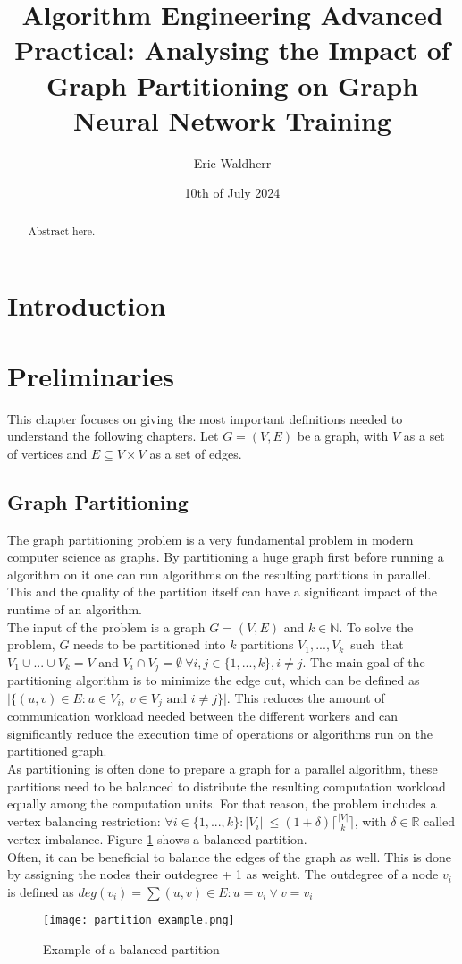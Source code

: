 \documentclass[acmsmall,nonacm,screen,review]{acmart}
\title{Algorithm Engineering Advanced Practical: Analysing the Impact of Graph Partitioning on Graph Neural Network Training}
\author{Eric Waldherr}
\affiliation{%
  \institution{Heidelberg University}
  \streetaddress{Im Neuenheimer Feld 205}
  \city{Heidelberg}
  \state{Baden-Württemberg}
  \country{Germany}
  \postcode{69120}
}
\date{10th of July 2024}
\begin{document}
\begin{abstract}
Abstract here.
\end{abstract}
\maketitle

\section{Introduction}

\section{Preliminaries}
This chapter focuses on giving the most important definitions needed to understand the following chapters. Let $G=(V,E)$ be a graph, with $V$ as a set of vertices and $E \subseteq V \times V$ as a set of edges.
\subsection{Graph Partitioning}
The graph partitioning problem is a very fundamental problem in modern computer science as graphs. By partitioning a huge graph first before running a algorithm on it one can run algorithms on the resulting partitions in parallel. This and the quality of the partition itself can have a significant impact of the runtime of an algorithm. \\ 
The input of the problem is a graph $G = (V,E)$ and $k\in \mathbb{N}$. To solve the problem, $G$ needs to be partitioned into $k$ partitions \hbox{$V_{1},...,V_{k}$ such that $V_{1}\cup...\cup V_{k} = V$} and $V_{i}\cap V_{j} = \emptyset\ \forall i,j\in \{1,...,k\}, i \neq j$. The main goal of the partitioning algorithm is to minimize the edge cut, which can be defined as $\vert \{(u,v)\in E : u\in V_{i},\ v\in V_{j} \text{ and } i\neq j \}\vert$. This reduces the amount of communication workload needed between the different workers and can significantly reduce the execution time of operations or algorithms run on the partitioned graph.  \\
As partitioning is often done to prepare a graph for a parallel algorithm, these partitions need to be balanced to distribute the resulting computation workload equally among the computation units. For that reason, the problem includes a vertex balancing restriction: $\forall i\in \{1,...,k\} : \vert V_{i}\vert \ \leq (1 + \delta) \lceil \frac{\vert V \vert }{k} \rceil $, with $\delta \in \mathbb{R}$ called vertex imbalance. Figure \ref{partition} shows a balanced partition. \\
Often, it can be beneficial to balance the edges of the graph as well. This is done by assigning the nodes their outdegree + 1 as weight. The outdegree of a node $v_{i}$ is defined as $deg(v_{i}) = \sum{(u,v)\in E : u = v_{i} \vee v = v_{i}}$
\begin{figure}[bt!]
\centering
\caption{Example of a balanced partition}
\label{partition}
\texttt{[image: partition\_example.png]}
\end{figure}
\end{document}
